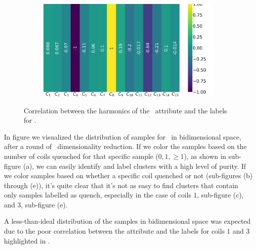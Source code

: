 \begin{figure}[!ht]
\begin{subfigure}{0.49\linewidth}
	\end{subfigure}
	\begin{subfigure}{0.49\linewidth}
		\includegraphics[width=\linewidth]{img/qlp_corr/An_coil3.png}
	\end{subfigure}
	\caption{Correlation between the harmonics of the \an\ attribute and the labels for \qlp.}
	\label{fig:an-lcorr-qlp}
\end{figure}

In figure  we visualized the distribution of samples for \an\ in
bidimensional space, after a round of \pca\ dimensionality reduction. If we color the samples based
on the number of coils quenched for that specific sample ($0, 1, \geq 1$), as shown in sub-figure
(a), we can easily identify and label clusters with a high level of purity. If we color samples
based on whether a specific coil quenched or not (sub-figures (b) through (e)), it's quite clear that it's not
as easy to find clusters that contain only samples labelled as quench, especially in the case of
coils $1$, sub-figure (c), and $3$, sub-figure (e).

A less-than-ideal distribution of the samples in bidimensional space was expected due to the poor
correlation between the attribute and the labels for coils $1$ and $3$ highlighted in .

